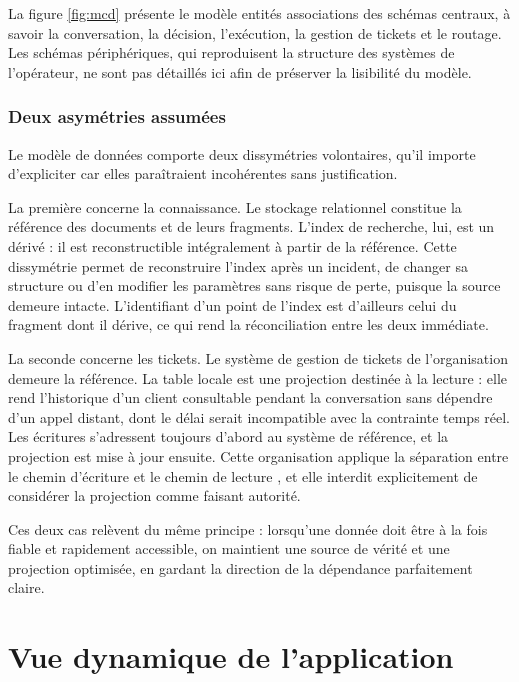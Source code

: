 La figure \ref{fig:mcd} présente le modèle entités associations des schémas centraux, à savoir la conversation, la décision, l'exécution, la gestion de tickets et le routage. Les schémas périphériques, qui reproduisent la structure des systèmes de l'opérateur, ne sont pas détaillés ici afin de préserver la lisibilité du modèle.


\subsubsection{Deux asymétries assumées}

Le modèle de données comporte deux dissymétries volontaires, qu'il importe d'expliciter car elles paraîtraient incohérentes sans justification.

La première concerne la connaissance. Le stockage relationnel constitue la référence des documents et de leurs fragments. L'index de recherche, lui, est un dérivé : il est reconstructible intégralement à partir de la référence. Cette dissymétrie permet de reconstruire l'index après un incident, de changer sa structure ou d'en modifier les paramètres sans risque de perte, puisque la source demeure intacte. L'identifiant d'un point de l'index est d'ailleurs celui du fragment dont il dérive, ce qui rend la réconciliation entre les deux immédiate.

La seconde concerne les tickets. Le système de gestion de tickets de l'organisation demeure la référence. La table locale est une projection destinée à la lecture : elle rend l'historique d'un client consultable pendant la conversation sans dépendre d'un appel distant, dont le délai serait incompatible avec la contrainte temps réel. Les écritures s'adressent toujours d'abord au système de référence, et la projection est mise à jour ensuite. Cette organisation applique la séparation entre le chemin d'écriture et le chemin de lecture \cite{fowler}, et elle interdit explicitement de considérer la projection comme faisant autorité.

Ces deux cas relèvent du même principe : lorsqu'une donnée doit être à la fois fiable et rapidement accessible, on maintient une source de vérité et une projection optimisée, en gardant la direction de la dépendance parfaitement claire.

\section{Vue dynamique de l'application}

